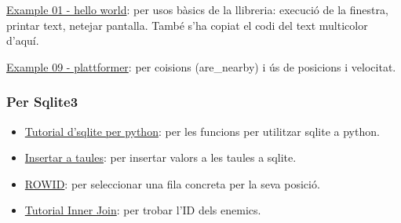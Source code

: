 \begin{itemize}
\begin{item}
\href{https://raw.githubusercontent.com/kitao/pyxel/main/python/pyxel/examples/01_hello_pyxel.py}
{Example 01 - hello world}:
per usos b\`asics de la llibreria:
execuci\'o de la finestra, printar text, netejar pantalla.
Tamb\'e s'ha copiat el codi del text multicolor d'aqu\'i.
\end{item}

\begin{item}
\href{https://raw.githubusercontent.com/kitao/pyxel/main/python/pyxel/examples/10_platformer.py}
{Example 09 - plattformer}:
per co\lgem isions (are\_nearby) i \'us de posicions i velocitat.
\end{item}
\end{itemize}

\subsubsection*{Per Sqlite3}
\begin{itemize}
\item{\href{https://pynative.com/python-sqlite/}
{Tutorial d'sqlite per python}}:
per les funcions per utilitzar sqlite a python.

\item{\href{https://www.sqlite.org/lang_insert.html}
{Insertar a taules}}:
per insertar valors a les taules a sqlite.

\item{\href{https://sqlite.org/rowidtable.html}
{ROWID}}:
per seleccionar una fila concreta per la seva posici\'o.

\item{\href{https://www.sqlitetutorial.net/sqlite-inner-join/}
{Tutorial Inner Join}}:
per trobar l'ID dels enemics.
\end{itemize}

